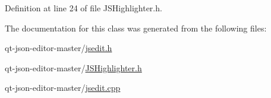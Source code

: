 Definition at line 24 of file J\+S\+Highlighter.\+h.



The documentation for this class was generated from the following files\+:\begin{DoxyCompactItemize}
\item 
qt-\/json-\/editor-\/master/\hyperlink{jsedit_8h}{jsedit.\+h}\item 
qt-\/json-\/editor-\/master/\hyperlink{_j_s_highlighter_8h}{J\+S\+Highlighter.\+h}\item 
qt-\/json-\/editor-\/master/\hyperlink{jsedit_8cpp}{jsedit.\+cpp}\end{DoxyCompactItemize}
